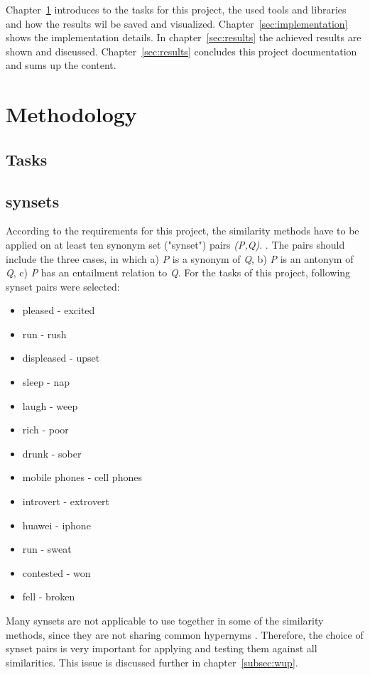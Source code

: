 \documentclass[conference]{IEEEtran}
\begin{document}
Chapter~\ref{sec:methodology} introduces to the tasks for this project, the used tools and libraries and how the results wil be saved and visualized. Chapter~\ref{sec:implementation} shows the implementation details. In chapter~\ref{sec:results} the achieved results are shown and discussed.  Chapter~\ref{sec:results} concludes this project documentation and sums up the content.

\section{Methodology}\label{sec:methodology}

\subsection{Tasks}


\subsection{synsets}
According to the requirements for this project, the similarity methods have to be applied on at least ten synonym set ("synset") pairs \textit{(P,Q)}. . The pairs should include the three cases, in which a) \textit{P} is a synonym of \textit{Q}, b) \textit{P} is an antonym of \textit{Q}, c) \textit{P} has an entailment relation to \textit{Q}. For the tasks of this project, following synset pairs were selected:
\begin{itemize}
\item pleased - excited
\item run - rush
\item displeased - upset
\item sleep - nap
\item laugh - weep
\item rich - poor
\item drunk - sober
\item mobile phones - cell phones
\item introvert - extrovert
\item huawei - iphone
\item run - sweat
\item contested - won
\item fell - broken
\end{itemize}
Many synsets are not applicable to use together in some of the similarity methods, since they are not sharing common hypernyms \cite{perkins}. Therefore, the choice of synset pairs is very important for applying and testing them against all similarities. This issue is discussed further in chapter~\ref{subsec:wup}.
\end{document}

